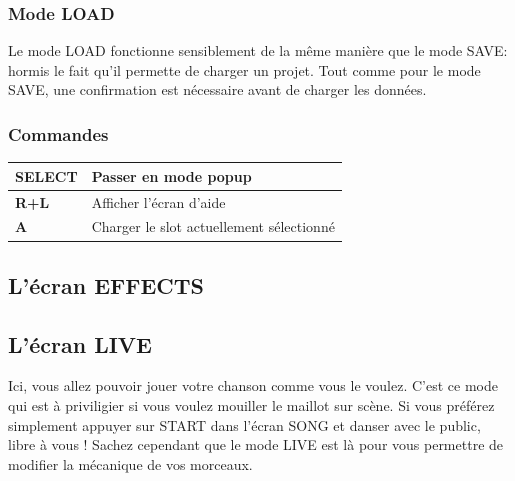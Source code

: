 \documentclass[12pt,a4paper]{article}
\begin{document}
    \subsubsection{Mode LOAD}

    Le mode LOAD fonctionne sensiblement de la même manière que le mode SAVE: hormis le fait qu'il permette de charger un projet.
    Tout comme pour le mode SAVE, une confirmation est nécessaire avant de charger les données.


    \subsubsection{Commandes}
    \tablelasttail{\hline}
    \begin{supertabular}{|l|p{11cm}|}
    \hline
        {\bf SELECT} & Passer en mode popup \\
        \hline
        {\bf R+L} & Afficher l'écran d'aide \\
        \hline
        {\bf A} & Charger le slot actuellement sélectionné \\
    \hline
    \end{supertabular}


    \subsection{L'écran EFFECTS}
    
    
    \subsection{L'écran LIVE}

    Ici, vous allez pouvoir jouer votre chanson comme vous le voulez.
    C'est ce mode qui est à priviligier si vous voulez mouiller le maillot sur scène.
    Si vous préférez simplement appuyer sur START dans l'écran SONG et danser avec le public, libre à vous !
    Sachez cependant que le mode LIVE est là pour vous permettre de modifier la mécanique de vos morceaux.
\end{document}
